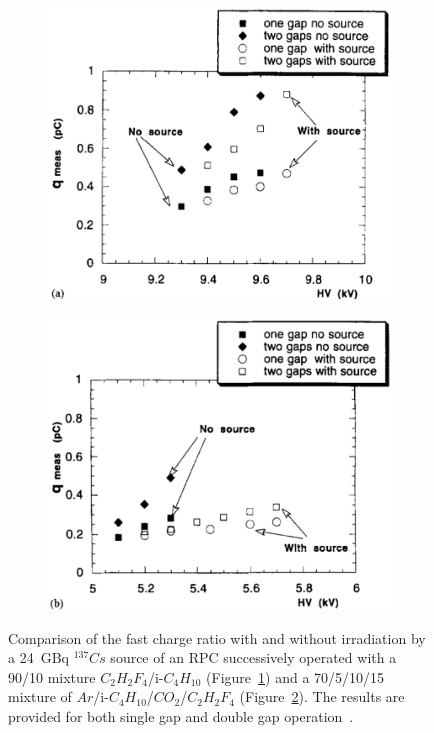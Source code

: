 	\begin{figure}[H]
		\begin{subfigure}{0.5\linewidth}
			\centering
			\includegraphics[width = 0.5\plotwidth]{fig/chapt4/Freon-fast-charge-irrad.png}
			\caption{\label{fig:FreonArgonFastCharge:A}}
		\end{subfigure}
		\begin{subfigure}{0.5\linewidth}
			\centering
			\includegraphics[width = 0.5\plotwidth]{fig/chapt4/Argon-fast-charge-irrad.png}
			\caption{\label{fig:FreonArgonFastCharge:B}}
		\end{subfigure}
		\caption{\label{fig:FreonArgonFastCharge} Comparison of the fast charge ratio with and without irradiation by a \SI{24}{GBq} $^{137}Cs$ source of an RPC successively operated with a 90/10 mixture $C_2H_2F_4$/i-$C_4H_{10}$ (Figure~\ref{fig:FreonArgonFastCharge:A}) and a 70/5/10/15 mixture of $Ar$/i-$C_4H_{10}$/$CO_2$/$C_2H_2F_4$ (Figure~\ref{fig:FreonArgonFastCharge:B}). The results are provided for both single gap and double gap operation~\cite{ABBRESCIA1997PERF}.}
	\end{figure}
	
